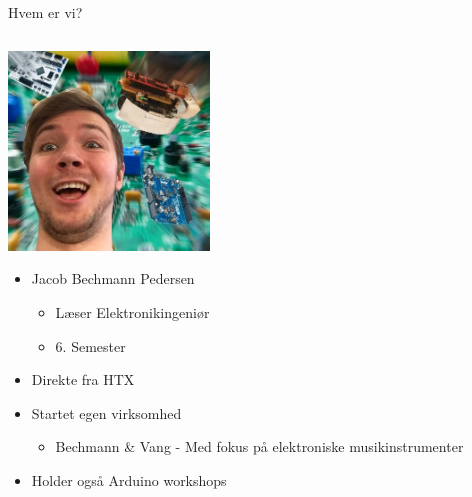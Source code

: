 \documentclass{beamer}
\begin{document}
\begin{frame}{Hvem er vi?}
	\begin{columns}

		\begin{column}{0.5\textwidth}
		\begin{center}
			\includegraphics[width=0.4\textwidth]{assets/jacob_bp.png}
		\end{center}
		\begin{itemize}
		\item{Jacob Bechmann Pedersen}
			\begin{itemize}
			\item{Læser Elektronikingeniør}
			\item{6. Semester}
			\end{itemize}
		\item{Direkte fra HTX}
		\item{Startet egen virksomhed}
			\begin{itemize}
			\item{Bechmann \& Vang - Med fokus på elektroniske musikinstrumenter}
			\end{itemize}
		\item{Holder også Arduino workshops}
		\end{itemize}
		\end{column}
		

\end{columns}
\end{frame}
\end{document}
